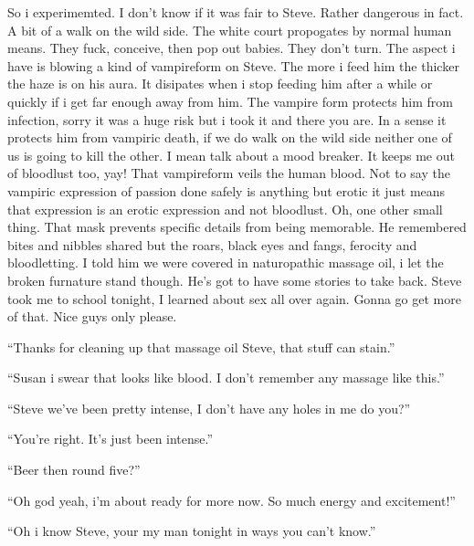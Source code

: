 So i experimemted. I don't know if it was fair to Steve. Rather dangerous in fact. A bit of a walk on the wild side. The white court propogates by normal human means. They fuck, conceive, then pop out babies. They don't turn. The aspect i have is blowing a kind of vampireform on Steve. The more i feed him the thicker the haze is on his aura. It disipates when i stop feeding him after a while or quickly if i get far enough away from him. The vampire form protects him from infection, sorry it was a huge risk but i took it and there you are. In a sense it protects him from vampiric death, if we do walk on the wild side neither one of us is going to kill the other. I mean talk about a mood breaker. It keeps me out of bloodlust too, yay! That vampireform veils the human blood. Not to say the vampiric expression of passion done safely is anything but erotic it just means that expression is an erotic expression and not bloodlust. Oh, one other small thing. That mask prevents specific details from being memorable. He remembered bites and nibbles shared but the roars, black eyes and fangs, ferocity and bloodletting. I told him we were covered in naturopathic massage oil, i let the broken furnature stand though. He's got to have some stories to take back. Steve took me to school tonight, I learned about sex all over again. Gonna go get more of that. Nice guys only please.

``Thanks for cleaning up that massage oil Steve, that stuff can stain.''

``Susan i swear that looks like blood. I don't remember any massage like this.''

``Steve we've been pretty intense, I don't have any holes in me do you?''

``You're right. It's just been intense.''

``Beer then round five?''

``Oh god yeah, i'm about ready for more now. So much energy and excitement!''

``Oh i know Steve, your my man tonight in ways you can't know.''

